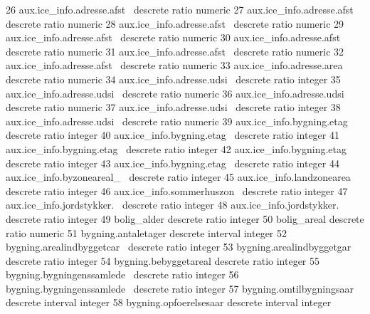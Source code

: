 \documentclass{report}
\begin{document}
\begin{Schunk}
\begin{Soutput}
 26 aux.ice_info.adresse.afst~ descrete         ratio           numeric         
 27 aux.ice_info.adresse.afst~ descrete         ratio           numeric         
 28 aux.ice_info.adresse.afst~ descrete         ratio           numeric         
 29 aux.ice_info.adresse.afst~ descrete         ratio           numeric         
 30 aux.ice_info.adresse.afst~ descrete         ratio           numeric         
 31 aux.ice_info.adresse.afst~ descrete         ratio           numeric         
 32 aux.ice_info.adresse.afst~ descrete         ratio           numeric         
 33 aux.ice_info.adresse.area~ descrete         ratio           numeric         
 34 aux.ice_info.adresse.udsi~ descrete         ratio           integer         
 35 aux.ice_info.adresse.udsi~ descrete         ratio           numeric         
 36 aux.ice_info.adresse.udsi~ descrete         ratio           numeric         
 37 aux.ice_info.adresse.udsi~ descrete         ratio           integer         
 38 aux.ice_info.adresse.udsi~ descrete         ratio           numeric         
 39 aux.ice_info.bygning.etag~ descrete         ratio           integer         
 40 aux.ice_info.bygning.etag~ descrete         ratio           integer         
 41 aux.ice_info.bygning.etag~ descrete         ratio           integer         
 42 aux.ice_info.bygning.etag~ descrete         ratio           integer         
 43 aux.ice_info.bygning.etag~ descrete         ratio           integer         
 44 aux.ice_info.byzoneareal_~ descrete         ratio           integer         
 45 aux.ice_info.landzonearea~ descrete         ratio           integer         
 46 aux.ice_info.sommerhuszon~ descrete         ratio           integer         
 47 aux.ice_info.jordstykker.~ descrete         ratio           integer         
 48 aux.ice_info.jordstykker.~ descrete         ratio           integer         
 49 bolig_alder                descrete         ratio           integer         
 50 bolig_areal                descrete         ratio           numeric         
 51 bygning.antaletager        descrete         interval        integer         
 52 bygning.arealindbyggetcar~ descrete         ratio           integer         
 53 bygning.arealindbyggetgar~ descrete         ratio           integer         
 54 bygning.bebyggetareal      descrete         ratio           integer         
 55 bygning.bygningenssamlede~ descrete         ratio           integer         
 56 bygning.bygningenssamlede~ descrete         ratio           integer         
 57 bygning.omtilbygningsaar   descrete         interval        integer         
 58 bygning.opfoerelsesaar     descrete         interval        integer         

\end{Soutput}
\end{Schunk}
\end{document}
